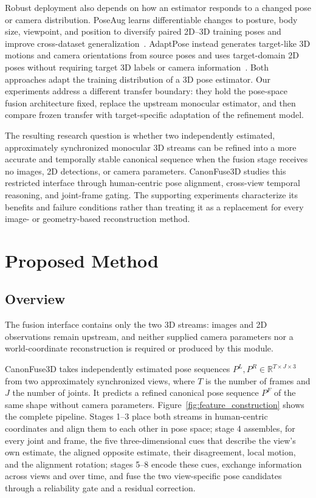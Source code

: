 \documentclass[preprint,12pt]{elsarticle}
\begin{document}
Robust deployment also depends on how an estimator responds to a changed pose or camera distribution. PoseAug learns differentiable changes to posture, body size, viewpoint, and position to diversify paired 2D--3D training poses and improve cross-dataset generalization~\cite{gong2021poseaug}. AdaptPose instead generates target-like 3D motions and camera orientations from source poses and uses target-domain 2D poses without requiring target 3D labels or camera information~\cite{gholami2022adaptpose}. Both approaches adapt the training distribution of a 3D pose estimator. Our experiments address a different transfer boundary: they hold the pose-space fusion architecture fixed, replace the upstream monocular estimator, and then compare frozen transfer with target-specific adaptation of the refinement model.

The resulting research question is whether two independently estimated, approximately synchronized monocular 3D streams can be refined into a more accurate and temporally stable canonical sequence when the fusion stage receives no images, 2D detections, or camera parameters. CanonFuse3D studies this restricted interface through human-centric pose alignment, cross-view temporal reasoning, and joint-frame gating. The supporting experiments characterize its benefits and failure conditions rather than treating it as a replacement for every image- or geometry-based reconstruction method.

\section{Proposed Method}
\label{sec:method}

\subsection{Overview}
\label{subsec:method_overview}

The fusion interface contains only the two 3D streams: images and 2D observations remain upstream, and neither supplied camera parameters nor a world-coordinate reconstruction is required or produced by this module.

CanonFuse3D takes independently estimated pose sequences \(P^L,P^R\in\mathbb{R}^{T\times J\times3}\) from two approximately synchronized views, where \(T\) is the number of frames and \(J\) the number of joints. It predicts a refined canonical pose sequence \(P^F\) of the same shape without camera parameters. Figure~\ref{fig:feature_construction} shows the complete pipeline. Stages 1--3 place both streams in human-centric coordinates and align them to each other in pose space; stage 4 assembles, for every joint and frame, the five three-dimensional cues that describe the view's own estimate, the aligned opposite estimate, their disagreement, local motion, and the alignment rotation; stages 5--8 encode these cues, exchange information across views and over time, and fuse the two view-specific pose candidates through a reliability gate and a residual correction.
\end{document}
